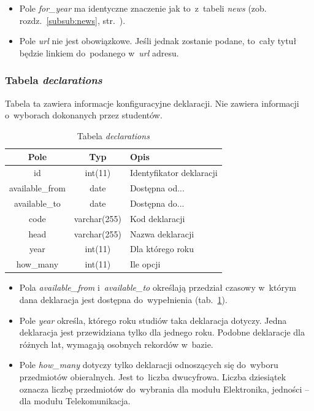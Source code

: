 \documentclass[a4paper,12pt,oneside]{report}
\begin{document}
\begin{itemize}
  \item Pole \emph{for\_year} ma identyczne znaczenie jak to~z~tabeli \emph{news} (zob. rozdz.~\ref{subsub:news}, str.~\pageref{subsub:news}).
  \item Pole \emph{url} nie jest obowiązkowe. Jeśli jednak zostanie podane, to~cały tytuł będzie linkiem do~podanego w~\emph{url} adresu.
\end{itemize}

\subsubsection{Tabela \emph{declarations}}
\label{subsub:declarations}
Tabela ta zawiera informacje konfiguracyjne deklaracji. Nie zawiera informacji o~wyborach dokonanych przez studentów.

\begin{table}[h]
  \centering
  \begin{tabular}{|c|c|l|}\hline
  Pole & Typ & Opis \\\hline
  id   & int(11)   & Identyfikator deklaracji\\
  available\_from & date         & Dostępna od... \\
  available\_to   & date         & Dostępna do... \\
  code            & varchar(255) & Kod deklaracji \\
  head            & varchar(255) & Nazwa deklaracji \\
  year            & int(11)      & Dla którego roku \\
  how\_many       & int(11)      & Ile opcji \\\hline

  \end{tabular}
  \caption{Tabela \emph{declarations}\label{tab:declarations}}
\end{table}

\begin{itemize}
  \item Pola \emph{available\_from} i~\emph{available\_to} określają przedział czasowy w~którym dana deklaracja jest dostępna do~wypełnienia (tab.~\ref{tab:declarations}).
  \item Pole \emph{year} określa, którego roku studiów taka deklaracja dotyczy. Jedna deklaracja jest przewidziana tylko dla jednego roku. Podobne deklaracje dla różnych lat, wymagają osobnych rekordów w~bazie.
  \item Pole \emph{how\_many} dotyczy tylko deklaracji odnoszących się do~wyboru przedmiotów obieralnych. Jest to~liczba dwucyfrowa. Liczba dziesiątek oznacza liczbę przedmiotów do~wybrania dla modułu Elektronika, jedności -- dla modułu Telekomunikacja.
\end{itemize}
\end{document}
